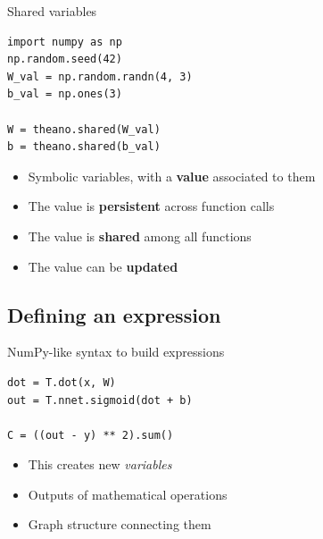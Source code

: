 \documentclass[a4paper,9pt]{beamer}
\begin{document}
\begin{frame}[fragile]{Shared variables}
  \begin{verbatim}
import numpy as np
np.random.seed(42)
W_val = np.random.randn(4, 3)
b_val = np.ones(3)

W = theano.shared(W_val)
b = theano.shared(b_val)
  \end{verbatim}
  \begin{itemize}
    \item Symbolic variables, with a \textbf{value} associated to them
    \item The value is \textbf{persistent} across function calls
    \item The value is \textbf{shared} among all functions
    \item The value can be \textbf{updated}
  \end{itemize}
\end{frame}

\subsection{Defining an expression}
\begin{frame}[fragile]{NumPy-like syntax to build expressions}
  \begin{verbatim}
dot = T.dot(x, W)
out = T.nnet.sigmoid(dot + b)

C = ((out - y) ** 2).sum()
  \end{verbatim}

  \begin{itemize}
    \item This creates new \emph{variables}
    \item Outputs of mathematical operations
    \item Graph structure connecting them
  \end{itemize}
\end{frame}
\end{document}
